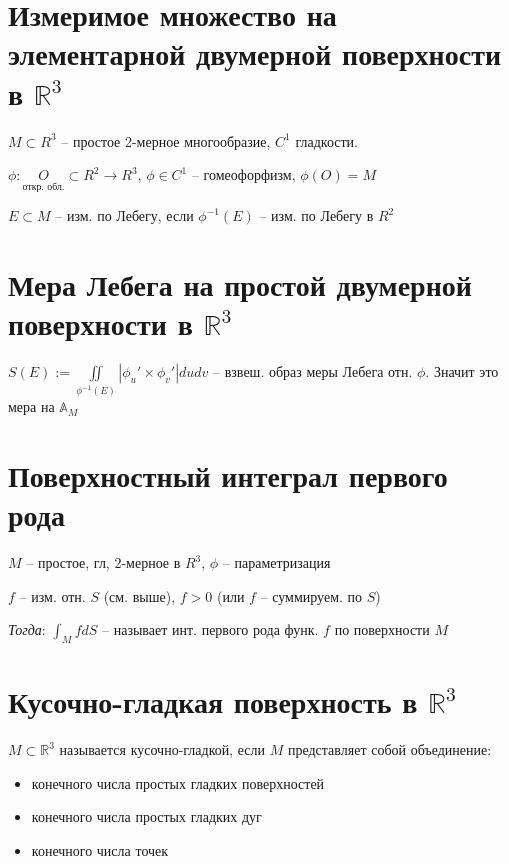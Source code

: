 	\section{Измеримое множество на элементарной двумерной поверхности в $\mathds{R}^3$}
	
	$ M \subset R^3 $ -- простое 2-мерное многообразие, $ C^1 $ гладкости.

	$ \phi : \underset{\text{откр. обл.}}{O} \subset R^2 \rightarrow R^3$, $ \phi \in C^1 $ -- гомеофорфизм, $ \phi(O) = M $

	$ E \subset M $ -- изм. по Лебегу, если $ \phi^{-1}(E) $ -- изм. по Лебегу в $ R^2 $
	
	\section{Мера Лебега на простой двумерной поверхности в $\mathds{R}^3$}

	$ S(E) := \iint\limits_{\phi^{-1}(E)} | \phi_u' \times \phi_v'| dudv $ -- взвеш. образ меры Лебега отн. $ \phi $. Значит это мера на $ \mathbb{A}_{M} $

	\section{Поверхностный интеграл первого рода}
        
        $ M $ -- простое, гл, 2-мерное в $ R^3 $, $ \phi $ -- параметризация

	$ f $ -- изм. отн. $S$ (см. выше), $ f > 0 $ (или $ f $ -- суммируем. по $ S $)

        \emph{Тогда}: $ \int_M f dS$ -- называет инт. первого рода функ. $ f $ по поверхности $M$

	\section{Кусочно-гладкая поверхность в $\mathds{R}^3$}
	
        $M \subset \mathbb R^3$ называется кусочно-гладкой, если $M$ представляет собой объединение:

    \begin{itemize}
	    \item конечного числа простых гладких поверхностей
	    \item конечного числа простых гладких дуг
	    \item конечного числа точек
    \end{itemize}

